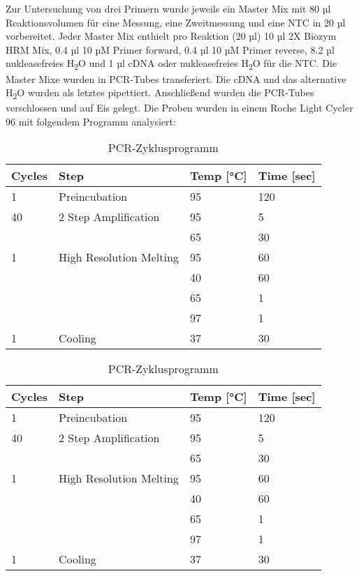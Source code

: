\documentclass{article}
\begin{document}
Zur Untersuchung von drei Primern wurde jeweils ein
Master Mix mit 80 µl Reaktionsvolumen für eine Messung,
eine Zweitmessung und eine NTC in 20 µl vorbereitet.
Jeder Master Mix enthielt pro Reaktion (20 µl) 10 µl 2X Biozym HRM Mix,
0.4 µl 10 µM Primer forward, 0.4 µl 10 µM Primer reverse, 8.2 µl
nukleasefreies H\textsubscript{2}O und 1 µl cDNA oder
nukleasefreies H\textsubscript{2}O für die NTC. Die Master Mixe
wurden in PCR-Tubes transferiert. Die cDNA und das
alternative H\textsubscript{2}O wurden als letztes pipettiert.
Anschließend wurden die PCR-Tubes verschlossen und auf Eis gelegt.
Die Proben wurden in einem Roche Light Cycler 96 mit folgendem
Programm analysiert:

\begin{table}[H]
\centering
\begin{tabular}{|l|l|l|l|}
\hline
\textbf{Cycles} & \textbf{Step} & \textbf{Temp [°C]} & \textbf{Time [sec]} \\ \hline
1 & Preincubation & 95 & 120 \\ \hline
40 & 2 Step Amplification & 95 & 5 \\ \hline
 &  & 65 & 30 \\ \hline
1 & High Resolution Melting & 95 & 60 \\ \hline
 &  & 40 & 60 \\ \hline
 &  & 65 & 1 \\ \hline
 &  & 97 & 1 \\ \hline
1 & Cooling & 37 & 30 \\ \hline
\end{tabular}
\caption{PCR-Zyklusprogramm}
\end{table}


\begin{table}[H]
    \centering
    \begin{tabular}{|l|l|l|l|}
    \hline
    \textbf{Cycles} & \textbf{Step} & \textbf{Temp [°C]} & \textbf{Time [sec]} \\ \hline
    1 & Preincubation & 95 & 120 \\ \hline
    40 & 2 Step Amplification & 95 & 5 \\ \hline
     &  & 65 & 30 \\ \hline
    1 & High Resolution Melting & 95 & 60 \\ \hline
     &  & 40 & 60 \\ \hline
     &  & 65 & 1 \\ \hline
     &  & 97 & 1 \\ \hline
    1 & Cooling & 37 & 30 \\ \hline
    \end{tabular}
    \caption{PCR-Zyklusprogramm}
    \end{table}
    
\end{document}
